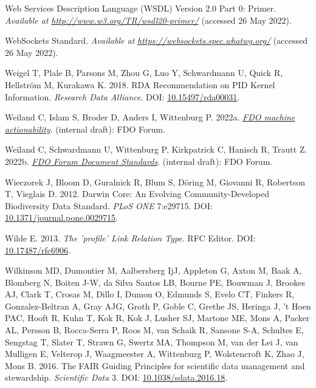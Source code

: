 \begin{CSLReferences}{1}{0}
\leavevmode{}%
Web Services Description Language (WSDL) Version 2.0 Part 0: Primer. \emph{Available at} \href{http://www.w3.org/TR/wsdl20-primer/}{\emph{http://www.w3.org/TR/wsdl20-primer/}} (accessed 26 May 2022).

\leavevmode{}%
WebSockets Standard. \emph{Available at} \href{https://websockets.spec.whatwg.org/}{\emph{https://websockets.spec.whatwg.org/}} (accessed 26 May 2022).

\leavevmode{}%
Weigel T, Plale B, Parsons M, Zhou G, Luo Y, Schwardmann U, Quick R, Hellström M, Kurakawa K. 2018. RDA Recommendation on PID Kernel Information. \emph{Research Data Alliance}. DOI: \href{https://doi.org/10.15497/rda00031}{10.15497/rda00031}.

\leavevmode{}%
Weiland C, Islam S, Broder D, Anders I, Wittenburg P. 2022a. \emph{\href{https://docs.google.com/document/d/1GHFPAUGpNvYaxctkx-CpvY1vKf_aGZpSlWGOWvyXSiQ/edit}{FDO machine actionability}}. (internal draft): FDO Forum.

\leavevmode{}%
Weiland C, Schwardmann U, Wittenburg P, Kirkpatrick C, Hanisch R, Trautt Z. 2022b. \emph{\href{https://docs.google.com/document/d/1lPNBBROjEoZ6fTfrtdqcMa3Q2G27PoC_/edit}{FDO Forum Document Standards}}. (internal draft): FDO Forum.

\leavevmode{}%
Wieczorek J, Bloom D, Guralnick R, Blum S, Döring M, Giovanni R, Robertson T, Vieglais D. 2012. Darwin Core: An Evolving Community-Developed Biodiversity Data Standard. \emph{PLoS ONE} 7:e29715. DOI: \href{https://doi.org/10.1371/journal.pone.0029715}{10.1371/journal.pone.0029715}.

\leavevmode{}%
Wilde E. 2013. \emph{The 'profile' Link Relation Type}. RFC Editor. DOI: \href{https://doi.org/10.17487/rfc6906}{10.17487/rfc6906}.

\leavevmode{}%
Wilkinson MD, Dumontier M, Aalbersberg IjJ, Appleton G, Axton M, Baak A, Blomberg N, Boiten J-W, da Silva Santos LB, Bourne PE, Bouwman J, Brookes AJ, Clark T, Crosas M, Dillo I, Dumon O, Edmunds S, Evelo CT, Finkers R, Gonzalez-Beltran A, Gray AJG, Groth P, Goble C, Grethe JS, Heringa J, 't Hoen PAC, Hooft R, Kuhn T, Kok R, Kok J, Lusher SJ, Martone ME, Mons A, Packer AL, Persson B, Rocca-Serra P, Roos M, van Schaik R, Sansone S-A, Schultes E, Sengstag T, Slater T, Strawn G, Swertz MA, Thompson M, van der Lei J, van Mulligen E, Velterop J, Waagmeester A, Wittenburg P, Wolstencroft K, Zhao J, Mons B. 2016. The FAIR Guiding Principles for scientific data management and stewardship. \emph{Scientific Data} 3. DOI: \href{https://doi.org/10.1038/sdata.2016.18}{10.1038/sdata.2016.18}.


\end{CSLReferences}
